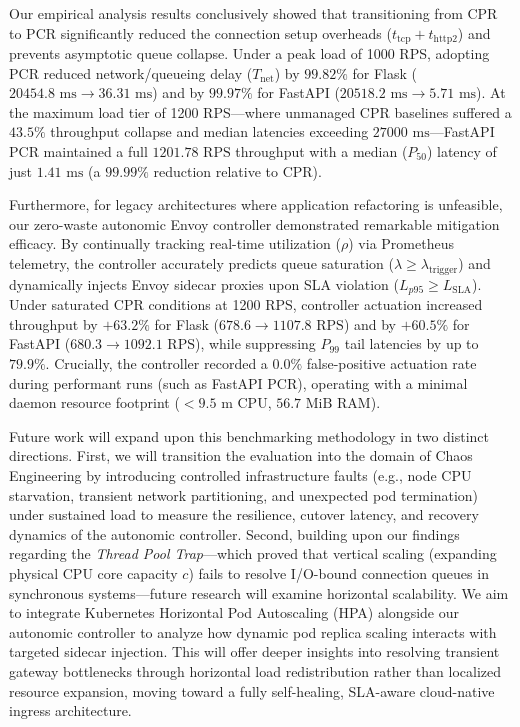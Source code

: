\documentclass{ieeeaccess}
\begin{document}
Our empirical analysis results conclusively showed that transitioning from CPR to PCR significantly reduced the connection setup overheads ($t_{\text{tcp}} + t_{\text{http2}}$) and prevents asymptotic queue collapse. Under a peak load of 1000 RPS, adopting PCR reduced network/queueing delay ($T_{\text{net}}$) by $99.82\%$ for Flask ($20454.8\text{ ms} \to 36.31\text{ ms}$) and by $99.97\%$ for FastAPI ($20518.2\text{ ms} \to 5.71\text{ ms}$). At the maximum load tier of 1200 RPS—where unmanaged CPR baselines suffered a $43.5\%$ throughput collapse and median latencies exceeding $27000\text{ ms}$—FastAPI PCR maintained a full $1201.78\text{ RPS}$ throughput with a median ($P_{50}$) latency of just $1.41\text{ ms}$ (a $99.99\%$ reduction relative to CPR). 

Furthermore, for legacy architectures where application refactoring is unfeasible, our zero-waste autonomic Envoy controller demonstrated remarkable mitigation efficacy. By continually tracking real-time utilization ($\rho$) via Prometheus telemetry, the controller accurately predicts queue saturation ($\lambda \ge \lambda_{\text{trigger}}$) and dynamically injects Envoy sidecar proxies upon SLA violation ($L_{p95} \ge L_{\text{SLA}}$). Under saturated CPR conditions at 1200 RPS, controller actuation increased throughput by $+63.2\%$ for Flask ($678.6 \to 1107.8\text{ RPS}$) and by $+60.5\%$ for FastAPI ($680.3 \to 1092.1\text{ RPS}$), while suppressing $P_{99}$ tail latencies by up to $79.9\%$. Crucially, the controller recorded a $0.0\%$ false-positive actuation rate during performant runs (such as FastAPI PCR), operating with a minimal daemon resource footprint ($< 9.5\text{ m}$ CPU, $56.7\text{ MiB}$ RAM). 

Future work will expand upon this benchmarking methodology in two distinct directions. First, we will transition the evaluation into the domain of Chaos Engineering by introducing controlled infrastructure faults (e.g., node CPU starvation, transient network partitioning, and unexpected pod termination) under sustained load to measure the resilience, cutover latency, and recovery dynamics of the autonomic controller. Second, building upon our findings regarding the \textit{Thread Pool Trap}—which proved that vertical scaling (expanding physical CPU core capacity $c$) fails to resolve I/O-bound connection queues in synchronous systems—future research will examine horizontal scalability. We aim to integrate Kubernetes Horizontal Pod Autoscaling (HPA) alongside our autonomic controller to analyze how dynamic pod replica scaling interacts with targeted sidecar injection. This will offer deeper insights into resolving transient gateway bottlenecks through horizontal load redistribution rather than localized resource expansion, moving toward a fully self-healing, SLA-aware cloud-native ingress architecture.
\end{document}
